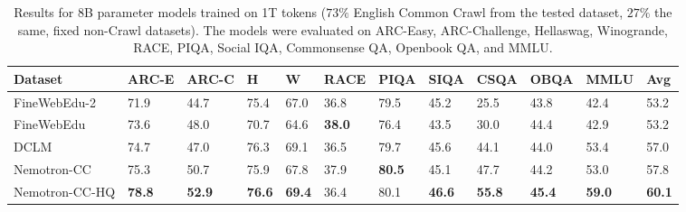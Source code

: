 \documentclass[11pt]{article}
\newcommand{\DCLM}{\textsc{DCLM}\xspace}
\newcommand{\Ours}{Nemotron-CC\xspace}
\begin{document}
\begin{table}[!hbt]\small\centering
\setlength{\tabcolsep}{5pt}
\begin{tabularx}{\textwidth}{Xlllllllllll}
\toprule
\textbf{Dataset}        & \textbf{ARC-E} & \textbf{ARC-C} & \textbf{H}    & \textbf{W}    & \textbf{RACE} & \textbf{PIQA} & \textbf{SIQA} & \textbf{CSQA} & \textbf{OBQA} & \textbf{MMLU} & \textbf{Avg}       \\ \midrule
FineWebEdu-2          & 71.9          & 44.7          & 75.4          & 67.0          & 36.8          & 79.5          & 45.2          & 25.5           & 43.8          & 42.4          & 53.2          \\
FineWebEdu            & 73.6          & 48.0          & 70.7          & 64.6          & \textbf{38.0} & 76.4          & 43.5          & 30.0           & 44.4          & 42.9          & 53.2          \\
\DCLM                 & 74.7          & 47.0          & 76.3          & 69.1          & 36.5          & 79.7          & 45.6          & 44.1           & 44.0          & 53.4          & 57.0          \\
\Ours                 & 75.3          & 50.7          & 75.9          & 67.8          & 37.9          & \textbf{80.5} & 45.1          & 47.7           & 44.2          & 53.0          & 57.8          \\
\Ours-HQ              & \textbf{78.8} & \textbf{52.9} & \textbf{76.6} & \textbf{69.4} & 36.4          & 80.1          & \textbf{46.6} & \textbf{55.8}  & \textbf{45.4} & \textbf{59.0} & \textbf{60.1} \\ \bottomrule
\end{tabularx}
\caption{Results for 8B parameter models trained on 1T tokens ($73\%$ English Common Crawl from the tested dataset, $27\%$ the same, fixed non-Crawl datasets). The models were evaluated on ARC-Easy, ARC-Challenge, Hellaswag, Winogrande, RACE, PIQA, Social IQA, Commonsense QA, Openbook QA, and MMLU.}
\label{table:main_detailed}
\end{table}
\end{document}
